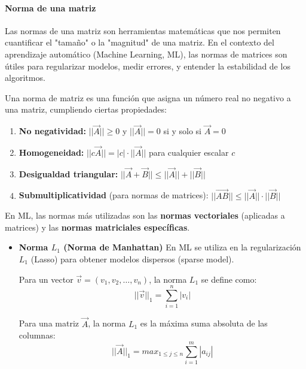 \paragraph{Norma de una matriz}
Las normas de una matriz son herramientas matemáticas que nos permiten cuantificar el "tamaño" o la "magnitud" de una matriz. En el contexto del aprendizaje automático (Machine Learning, ML), las normas de matrices son útiles para regularizar modelos, medir errores, y entender la estabilidad de los algoritmos.

Una norma de matriz es una función que asigna un número real no negativo a una matriz, cumpliendo ciertas propiedades:
\begin{enumerate}
\item \textbf{No negatividad:} $||\vec{A}|| \geq 0$ y $||\vec{A}|| = 0$ si y solo si $\vec{A} = 0$
\item \textbf{Homogeneidad:} $||c\vec{A}|| = |c| \cdot ||\vec{A}||$ para cualquier escalar $c$
\item \textbf{Desigualdad triangular:} $||\vec{A} + \vec{B}|| \leq ||\vec{A}|| + ||\vec{B}||$
\item \textbf{Submultiplicatividad} (para normas de matrices): $||\vec{AB}|| \leq ||\vec{A}|| \cdot ||\vec{B}||$
\end{enumerate}

En ML, las normas más utilizadas son las \textbf{normas vectoriales} (aplicadas a matrices) y las \textbf{normas matriciales específicas}.
\begin{itemize}
\item \textbf{Norma $L_1$ (Norma de Manhattan)} En ML se utiliza en la regularización $L_1$ (Lasso) para obtener modelos dispersos (sparse model).

Para un vector $\vec{v} = (v_1, v_2, \ldots, v_n)$, la norma $L_1$ se define como:
$$||\vec{v}||_1 = \sum^n_{i=1} |v_i|$$

Para una matriz $\vec{A}$, la norma $L_1$ es la máxima suma absoluta de las columnas:
$$||\vec{A}||_1 = max_{1 \leq j \leq n} \sum^m_{i=1} |a_{ij}|$$

\end{itemize}